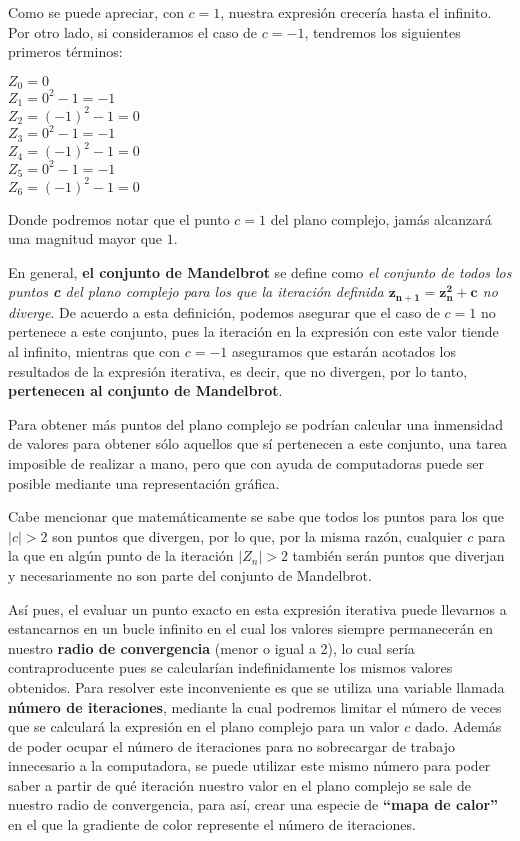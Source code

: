 \documentclass[12pt,a4paper]{article}
\begin{document}
		Como se puede apreciar, con $c = 1$, nuestra expresión crecería hasta el infinito.\\
		Por otro lado, si consideramos el caso de $c = -1$, tendremos los siguientes primeros términos:
		\begin{center}
			$Z_{0} = 0$\\
			$Z_{1} = 0^2 - 1 = -1$\\
			$Z_{2} = (-1)^2 - 1 = 0$\\
			$Z_{3} = 0^2 - 1 = -1$\\
			$Z_{4} = (-1)^2 - 1 = 0$\\
			$Z_{5} = 0^2 - 1 = -1$\\
			$Z_{6}= (-1)^2 - 1 = 0$\\
		\end{center}
		Donde podremos notar que el punto $c = 1$ del plano complejo, jamás alcanzará una magnitud mayor que $1$.

		En general, \textbf{el conjunto de Mandelbrot} se define como \textit{el conjunto de todos los puntos \textbf{c} del plano complejo para los que la iteración definida $\mathbf{z_{n+1} = z_{n}^2 + c}$ no diverge}. De acuerdo a esta definición, podemos asegurar que el caso de $c = 1$ no pertenece a este conjunto, pues la iteración en la expresión con este valor tiende al infinito, mientras que con $c = -1$ aseguramos que estarán acotados los resultados de la expresión iterativa, es decir, que no divergen, por lo tanto, \textbf{pertenecen al conjunto de Mandelbrot}.
		
		Para obtener más puntos del plano complejo se podrían calcular una inmensidad de valores para obtener sólo aquellos que sí pertenecen a este conjunto, una tarea imposible de realizar a mano, pero que con ayuda de computadoras puede ser posible mediante una representación gráfica.
		
		Cabe mencionar que matemáticamente se sabe que todos los puntos para los que $|c| > 2$ son puntos que divergen, por lo que, por la misma razón, cualquier $c$ para la que en algún punto de la iteración $|Z_{n}| > 2$ también serán puntos que diverjan y necesariamente no son parte del conjunto de Mandelbrot.
		
		Así pues, el evaluar un punto exacto en esta expresión iterativa puede llevarnos a estancarnos en un bucle infinito en el cual los valores siempre permanecerán en nuestro \textbf{radio de convergencia} (menor o igual a 2), lo cual sería contraproducente pues se calcularían indefinidamente los mismos valores obtenidos. Para resolver este inconveniente es que se utiliza una variable llamada \textbf{número de iteraciones}, mediante la cual podremos limitar el número de veces que se calculará la expresión en el plano complejo para un valor $c$ dado. Además de poder ocupar el número de iteraciones para no sobrecargar de trabajo innecesario a la computadora, se puede utilizar este mismo número para poder saber a partir de qué iteración nuestro valor en el plano complejo se sale de nuestro radio de convergencia, para así, crear una especie de \textbf{“mapa de calor”} en el que la gradiente de color represente el número de iteraciones.
	
\end{document}

